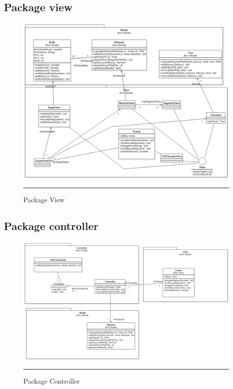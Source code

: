 \subsection{Package view}
\begin{figure}[H]
	\centering
		\includegraphics[width=\textwidth,height=\textheight,keepaspectratio, angle=90]{Figures/vue}
		\rule{35em}{0.5pt}
	\caption[View]{Package View}
\end{figure}

\subsection{Package controller}
\begin{figure}[H]
	\centering
		\includegraphics[width=\textwidth,height=\textheight,keepaspectratio, angle=90]{Figures/controleur}
		\rule{35em}{0.5pt}
	\caption[Controller]{Package Controller}
\end{figure}


